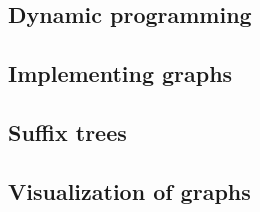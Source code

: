 \documentclass[thesis.tex]{subfiles}
\begin{document}
\subsection{Dynamic programming}
\label{sec:dynamic_programming}
\subsection{Implementing graphs}
\subsection{Suffix trees}
\subsection{Visualization of graphs}
\end{document}
